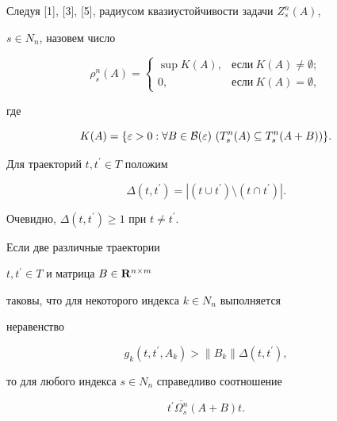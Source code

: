 Следуя [1], [3], [5], радиусом квазиустойчивости задачи $Z^n_s(A)$,


$s\in N_n$, назовем число


$$


\rho^n_s(A)=


\begin{cases}


\sup K(A), & \text{если}\ K(A) \neq \emptyset;\\ 0, & \text{если}\


K(A)=\emptyset,


\end{cases}


$$


где


$$


K(A)=\{\varepsilon >0  : \forall B\in{\cal B}(\varepsilon)


\ (T^n_s(A) \subseteq T^n_s(A+B))\}.


$$





Для траекторий $t, t^{\prime} \in T$ положим


$$


\Delta(t,t^{\prime})=|(t \cup t^{\prime})\setminus


(t \cap t^{\prime})|.


$$


Очевидно, $\Delta(t,t^{\prime}) \geq 1$ при $t \neq t^{\prime}$.





\begin{lem}


Если две различные траектории


$t,t^{\prime}\in T$ и матрица \mbox{$B\in \bold{R}^{n\times m}$}


таковы, что для некоторого индекса $k\in N_n$ выполняется


неравенство


\begin{equation} 


g_k(t,t^{\prime},A_k)>\|B_k\|\Delta(t,t^{\prime}),


\end{equation}


то для любого индекса $s\in N_n$ справедливо соотношение


$$


t^{\prime}\overline{\Omega^n_s}(A+B) t.


$$


\end{lem}





